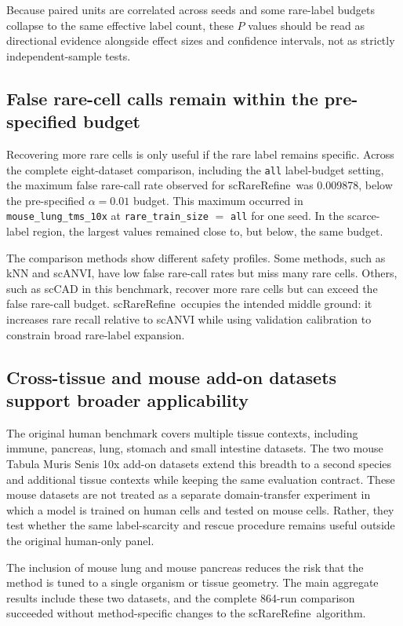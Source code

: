 \documentclass[11pt]{article}
\newcommand{\method}{scRareRefine}
\newcommand{\rts}{\texttt{rare\_train\_size}}
\begin{document}
Because paired units are correlated across seeds and some rare-label budgets
collapse to the same effective label count, these $P$ values should be read as
directional evidence alongside effect sizes and confidence intervals, not as
strictly independent-sample tests.

\subsection{False rare-cell calls remain within the pre-specified budget}

Recovering more rare cells is only useful if the rare label remains specific.
Across the complete eight-dataset comparison, including the \texttt{all}
label-budget setting, the maximum false rare-call rate observed for \method\
was 0.009878, below the pre-specified $\alpha=0.01$ budget. This maximum
occurred in \texttt{mouse\_lung\_tms\_10x} at \rts{} $=$ \texttt{all} for one
seed. In the scarce-label region, the largest values remained close to, but
below, the same budget.

The comparison methods show different safety profiles. Some methods, such as
kNN and scANVI, have low false rare-call rates but miss many rare cells. Others,
such as scCAD in this benchmark, recover more rare cells but can exceed the
false rare-call budget. \method\ occupies the intended middle ground: it
increases rare recall relative to scANVI while using validation calibration to
constrain broad rare-label expansion.

\subsection{Cross-tissue and mouse add-on datasets support broader applicability}

The original human benchmark covers multiple tissue contexts, including immune,
pancreas, lung, stomach and small intestine datasets. The two mouse Tabula Muris
Senis 10x add-on datasets extend this breadth to a second species and
additional tissue contexts while keeping the same evaluation contract. These
mouse datasets are not treated as a separate domain-transfer experiment in
which a model is trained on human cells and tested on mouse cells. Rather, they
test whether the same label-scarcity and rescue procedure remains useful
outside the original human-only panel.

The inclusion of mouse lung and mouse pancreas reduces the risk that the method
is tuned to a single organism or tissue geometry. The main aggregate results
include these two datasets, and the complete 864-run comparison succeeded
without method-specific changes to the \method\ algorithm.
\end{document}
